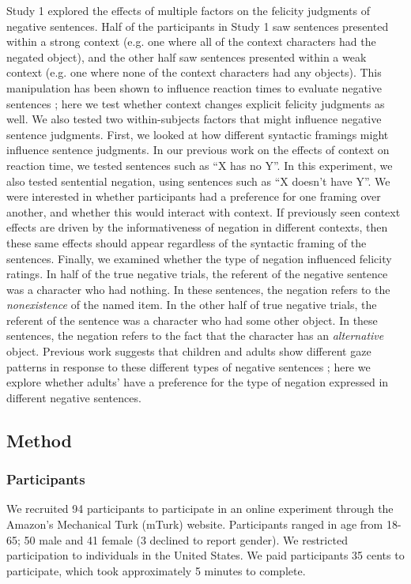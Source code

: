 \documentclass[10pt,letterpaper]{article}
\begin{document}
Study 1 explored the effects of multiple factors on the felicity judgments of negative sentences.  Half of the participants in Study 1 saw sentences presented within a strong context (e.g. one where all of the context characters had the negated object), and the other half saw sentences presented within a weak context (e.g. one where none of the context characters had any objects).  This manipulation has been shown to influence reaction times to evaluate negative sentences \cite{nordmeyer2014}; here we test whether context changes explicit felicity judgments as well.  We also tested two within-subjects factors that might influence negative sentence judgments.  First, we looked at how different syntactic framings might influence sentence judgments.  In our previous work on the effects of context on reaction time, we tested sentences such as ``X has no Y''.  In this experiment, we also tested sentential negation, using sentences such as ``X doesn't have Y''.  We were interested in whether participants had a preference for one framing over another, and whether this would interact with context.  If previously seen context effects are driven by the informativeness of negation in different contexts, then these same effects should appear regardless of the syntactic framing of the sentences.  Finally, we examined whether the type of negation influenced felicity ratings.  In half of the true negative trials, the referent of the negative sentence was a character who had nothing.  In these sentences, the negation refers to the \emph{nonexistence} of the named item.  In the other half of true negative trials, the referent of the sentence was a character who had some other object.  In these sentences, the negation refers to the fact that the character has an \emph{alternative} object.  Previous work suggests that children and adults show different gaze patterns in response to these different types of negative sentences \cite{nordmeyer2014b}; here we explore whether adults' have a preference for the type of negation expressed in different negative sentences.

\subsection{Method}

\subsubsection{Participants}
We recruited 94 participants to participate in an online experiment through the Amazon's Mechanical Turk (mTurk) website.  Participants ranged in age from 18-65; 50 male and 41 female (3 declined to report gender).  We restricted participation to individuals in the United States. We paid participants 35 cents to participate, which took approximately 5 minutes to complete.  
\end{document}
